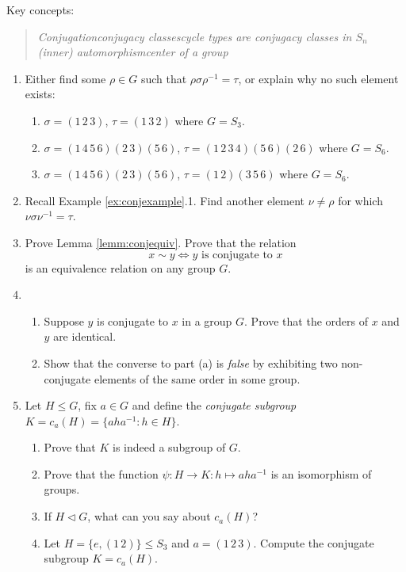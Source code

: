 \goodbreak

\begin{exercises}{}{}
Key concepts:
\begin{quote}
	\emph{Conjugation\qquad conjugacy classes\qquad cycle types are conjugacy classes in $S_n$\\
	(inner) automorphism\qquad center of a group}
\end{quote}

\begin{enumerate}    
  \item Either find some $\rho\in G$ such that $\rho\sigma\rho^{-1}=\tau$, or explain why no such element exists:
	\begin{enumerate}
  	\item $\sigma=(1\,2\,3)$, $\tau=(1\,3\,2)$ where $G=S_3$.
  	\item $\sigma=(1\,4\,5\,6)(2\,3)(5\,6)$, $\tau=(1\,2\,3\,4)(5\,6)(2\,6)$ where $G=S_6$.
  	\item $\sigma=(1\,4\,5\,6)(2\,3)(5\,6)$, $\tau=(1\,2)(3\,5\,6)$ where $G=S_6$.
	\end{enumerate}
	
	
  \item Recall Example \ref{ex:conjexample}.1. Find another element $\nu\neq\rho$ for which $\nu\sigma\nu^{-1}=\tau$.
  
  
  \item Prove Lemma \ref{lemm:conjequiv}. Prove that the relation
  \[x\sim y\iff \text{$y$ is conjugate to $x$}\]
  is an equivalence relation on any group $G$. 
  

	\item\begin{enumerate}
  	\item Suppose $y$ is conjugate to $x$ in a group $G$. Prove that the orders of $x$ and $y$ are identical.
  	\item Show that the converse to part (a) is \emph{false} by exhibiting two non-conjugate elements of the same order in some group.
	\end{enumerate}


	\item Let $H\le G$, fix $a\in G$ and define the \emph{conjugate subgroup} $K=c_a(H)=\{aha^{-1}:h\in H\}$.
  \begin{enumerate}
    \item Prove that $K$ is indeed a subgroup of $G$.
    \item Prove that the function $\psi:H\to K:h\mapsto aha^{-1}$ is an isomorphism of groups.
    \item If $H\triangleleft G$, what can you say about $c_a(H)$?
    \item Let $H=\{e,(1\,2)\}\le S_3$ and $a=(1\,2\,3)$. Compute the conjugate subgroup $K=c_a(H)$.
  \end{enumerate}
  

\end{enumerate}
\end{exercises}
